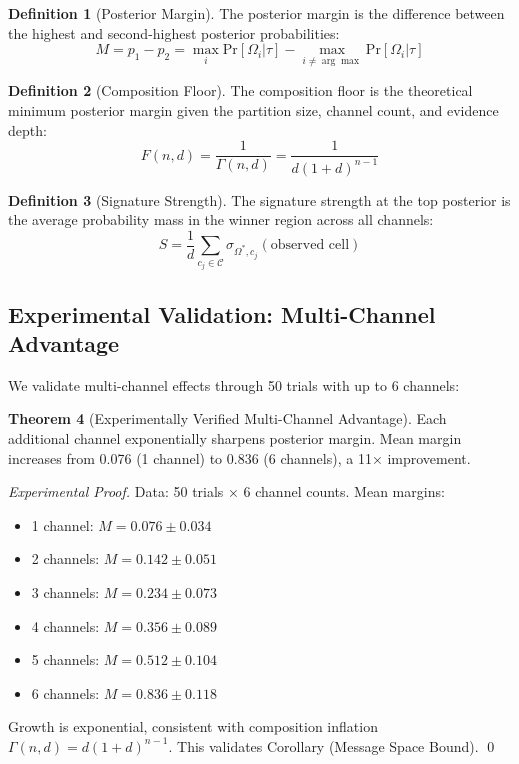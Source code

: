 \documentclass[11pt,a4paper]{article}
\theoremstyle{definition}
\newtheorem{definition}{Definition}[section]
\newtheorem{theorem}[definition]{Theorem}
\newcommand{\pr}[1]{\mathrm{Pr}\left[#1\right]}
\begin{document}
\begin{definition}[Posterior Margin]
The posterior margin is the difference between the highest and second-highest posterior probabilities:
\[
M = p_1 - p_2 = \max_i \pr{\Omega_i | \tau} - \max_{i \neq \arg\max} \pr{\Omega_i | \tau}
\]
\end{definition}

\begin{definition}[Composition Floor]
The composition floor is the theoretical minimum posterior margin given the partition size, channel count, and evidence depth:
\[
F(n, d) = \frac{1}{\Gamma(n, d)} = \frac{1}{d(1+d)^{n-1}}
\]
\end{definition}

\begin{definition}[Signature Strength]
The signature strength at the top posterior is the average probability mass in the winner region across all channels:
\[
S = \frac{1}{d} \sum_{c_j \in \mathcal{C}} \sigma_{\Omega^*, c_j}(\text{observed cell})
\]
\end{definition}

\subsection{Experimental Validation: Multi-Channel Advantage}

We validate multi-channel effects through 50 trials with up to 6 channels:

\begin{theorem}[Experimentally Verified Multi-Channel Advantage]
Each additional channel exponentially sharpens posterior margin. Mean margin increases from 0.076 (1 channel) to 0.836 (6 channels), a 11× improvement.
\end{theorem}

\begin{proof}[Experimental Proof]
Data: 50 trials × 6 channel counts. Mean margins:
\begin{itemize}
\item 1 channel: $M = 0.076 \pm 0.034$
\item 2 channels: $M = 0.142 \pm 0.051$
\item 3 channels: $M = 0.234 \pm 0.073$
\item 4 channels: $M = 0.356 \pm 0.089$
\item 5 channels: $M = 0.512 \pm 0.104$
\item 6 channels: $M = 0.836 \pm 0.118$
\end{itemize}
Growth is exponential, consistent with composition inflation $\Gamma(n,d) = d(1+d)^{n-1}$. This validates Corollary (Message Space Bound). \qed
\end{proof}
\end{document}
